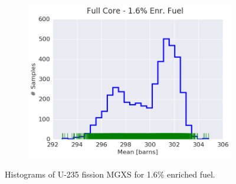 \begin{figure}[h!]
\begin{subfigure}{0.5\textwidth}
  \includegraphics[width=\linewidth]{figures/patterns/full-core/hist-kde-rug/16-enr-fiss-2} \caption{}
  \label{fig:chap9-hist-full-core-1.6-fiss}
\end{subfigure}
\caption[Histogram of U-235 fission MGXS for 1.6\% enriched fuel]{Histograms of U-235 fission \ac{MGXS} for 1.6\% enriched fuel.}
\label{fig:chap9-hist-1.6-fiss}
\end{figure}

